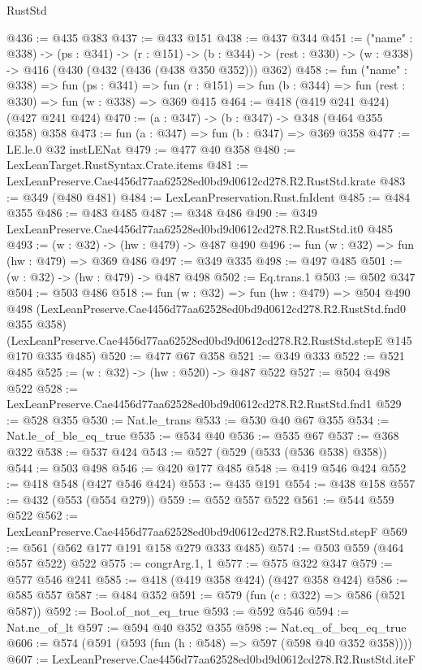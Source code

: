 \begin{lexlean}{RustStd}
\begin{coremodule}
@436 := @435 @383
@437 := @433 @151
@438 := @437 @344
@451 := ("name" : @338) ->
  (ps : @341) ->
  (r : @151) ->
  (b : @344) -> (rest : @330) -> (w : @338) -> @416 (@430 (@432 (@436 (@438 @350 @352))) @362)
@458 := fun ("name" : @338) =>
  fun (ps : @341) =>
  fun (r : @151) => fun (b : @344) => fun (rest : @330) => fun (w : @338) => @369 @415
@464 := @418 (@419 @241 @424) (@427 @241 @424)
@470 := (a : @347) -> (b : @347) -> @348 (@464 @355 @358) @358
@473 := fun (a : @347) => fun (b : @347) => @369 @358
@477 := LE.le.{0} @32 instLENat
@479 := @477 @40 @358
@480 := LexLeanTarget.RustSyntax.Crate.items
@481 := LexLeanPreserve.Cae4456d77aa62528ed0bd9d0612cd278.R2.RustStd.krate
@483 := @349 (@480 @481)
@484 := LexLeanPreservation.Rust.fnIdent
@485 := @484 @355
@486 := @483 @485
@487 := @348 @486
@490 := @349 LexLeanPreserve.Cae4456d77aa62528ed0bd9d0612cd278.R2.RustStd.it0 @485
@493 := (w : @32) -> (hw : @479) -> @487 @490
@496 := fun (w : @32) => fun (hw : @479) => @369 @486
@497 := @349 @335
@498 := @497 @485
@501 := (w : @32) -> (hw : @479) -> @487 @498
@502 := Eq.trans.{1}
@503 := @502 @347
@504 := @503 @486
@518 := fun (w : @32) =>
  fun (hw : @479) =>
  @504
    @490
    @498
    (LexLeanPreserve.Cae4456d77aa62528ed0bd9d0612cd278.R2.RustStd.fnd0 @355 @358)
    (LexLeanPreserve.Cae4456d77aa62528ed0bd9d0612cd278.R2.RustStd.stepE @145 @170 @335 @485)
@520 := @477 @67 @358
@521 := @349 @333
@522 := @521 @485
@525 := (w : @32) -> (hw : @520) -> @487 @522
@527 := @504 @498 @522
@528 := LexLeanPreserve.Cae4456d77aa62528ed0bd9d0612cd278.R2.RustStd.fnd1
@529 := @528 @355
@530 := Nat.le_trans
@533 := @530 @40 @67 @355
@534 := Nat.le_of_ble_eq_true
@535 := @534 @40
@536 := @535 @67
@537 := @368 @322
@538 := @537 @424
@543 := @527 (@529 (@533 (@536 @538) @358))
@544 := @503 @498
@546 := @420 @177 @485
@548 := @419 @546 @424
@552 := @418 @548 (@427 @546 @424)
@553 := @435 @191
@554 := @438 @158
@557 := @432 (@553 (@554 @279))
@559 := @552 @557 @522
@561 := @544 @559 @522
@562 := LexLeanPreserve.Cae4456d77aa62528ed0bd9d0612cd278.R2.RustStd.stepF
@569 := @561 (@562 @177 @191 @158 @279 @333 @485)
@574 := @503 @559 (@464 @557 @522) @522
@575 := congrArg.{1, 1}
@577 := @575 @322 @347
@579 := @577 @546 @241
@585 := @418 (@419 @358 @424) (@427 @358 @424)
@586 := @585 @557
@587 := @484 @352
@591 := @579 (fun (c : @322) => @586 (@521 @587))
@592 := Bool.of_not_eq_true
@593 := @592 @546
@594 := Nat.ne_of_lt
@597 := @594 @40 @352 @355
@598 := Nat.eq_of_beq_eq_true
@606 := @574 (@591 (@593 (fun (h : @548) => @597 (@598 @40 @352 @358))))
@607 := LexLeanPreserve.Cae4456d77aa62528ed0bd9d0612cd278.R2.RustStd.iteF

\end{coremodule}
\end{lexlean}
